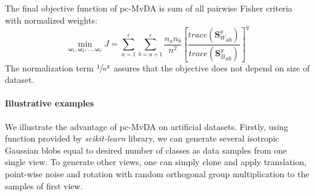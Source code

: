         The final objective function of pc-MvDA is sum of all pairwise Fisher criteria with normalized weights:
        \begin{equation}
            \operatorname*{min}_{\boldsymbol{\omega}_1, \boldsymbol{\omega}_2,..., \boldsymbol{\omega}_v}{J}=\sum_{a=1}^{c}\sum_{b=a+1}^{c}{\frac{n_an_b}{n^2}{\left[{\frac{trace\left({\boldsymbol{S}_W^y}_{ab}\right)}{trace\left({\boldsymbol{S}_B^y}_{ab}\right)}}\right]}^{q}}
            \label{eq:pc-MvDA}
        \end{equation}
        The normalization term $\sfrac{1}{n^2}$ assures that the objective does not depend on size of dataset.


    \paragraph{Illustrative examples}
        We illustrate the advantage of pc-MvDA on artificial datasets.
        Firstly, using function provided by \textit{scikit-learn} library, we can generate several isotropic Gaussian blobs equal to desired number of classes as data samples from one single view.  %
        To generate other views, one can simply clone and apply translation, point-wise noise and rotation with random orthogonal group multiplication to the samples of first view.

